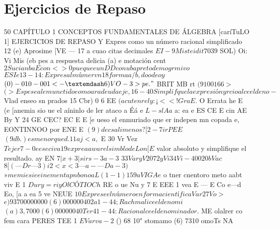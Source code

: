 \documentclass[12pt]{article}
\begin{document}
\section*{Ejercicios de Repaso}
50 CAPÍTULO 1 CONCEPTOS FUNDAMENTALES DE ÁLGEBRA
[caríTuLO 1] EJERCICIOS DE REPASO
Y Expres como un número racional simplificado 12 (e) Aprosime [VE — 17 a cuao citas decimales
$EI-9 Mist ei dit 7039$
SOL) Oi: Vi Mis (eb pes a respuesta delicia (a) e motación cent
$2 Sucia nba Econ <> 0 pue que eun DD con uba preto demo grmivo$
$ES Ie 13-14: Expres al múmervn 18 forma a/b, doodeo y$
$(0) -010-001 <-— 6) VO-3 > pe . "$
BRIT MB rt
$(9 100166 >$
$(> Espese al emunctidoeomoara deuda eje, 16-40 Simplifque la expresión y rcioalce el deno-$
Vlad enseo sn prados
15 Cbr) 0 6 EE
$(acutenrely: ¡<<! Gra E.$
O Errata he E (e
[anemia sio ue el aíninlo de ler ataco a Éá e
$L-sl Aa$
a: ea e
ES CE E
cin AE
By Y 24 GE
CEC? EC E E
[e ueso el enmuriado que er indepen mn copada e, EONTINNOO por
ENE E
$(9) de csalimenos? [2-7 ir PEE$
$(9 db.) esmenorqued. 11 aj<a ,$
E 30 Vr Vez
$Tejer 7-0 eeseciva 19 expre aa war el simblo de Lon [E$
valor absoluto y simplifique el resultado. ay EN
$7 |x+3|sirs-3 a-3$
$33 Vary V207 2yVi 34 Vi-400 20bVac$
$8 [(— Dr —3)i2<x<3 —a-—Da-3)$
$» memiesieeinementapn bono a L( 1-1) 159 a VIGA e$
o tner cnentoro meto aabt viv E
1
$Dury=riy Ol CÓTIO Ch$
RE o ue
Nu y 7 E EEE
1 vea
E — E
Co e—d Eo, [a a ea
5 ve NEUE
$10 Exprese el número en forma científica Var 27 Vo >$
$e) 93700000000 (6) 000000402 a 1-44; Rachmalice el denomi$
$(a) 3,7000 (6) 00000040 Ter 41-44: Racionalce el denominador.$
ME olalrer co fem cara PERES TEE 1
$E Var va-2$
() 68 10" stomamo (6) 7310 omoTs NA
\end{document}
